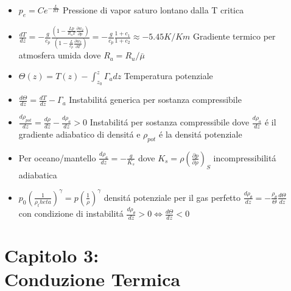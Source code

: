 \documentclass[a4paper]{article}
\begin{document}
\begin{itemize}
	\item $ p_e = C e^{- \frac{L}{RT}}$ Pressione di vapor saturo lontano dalla T critica
	\item $\frac{dT}{dz} = -\frac{g}{c_p} \frac{(1-\frac{Lp}{R_a T} \frac{\partial w_2}{\partial p})}{(1- \frac{L}{c_p} \frac{\partial w_2}{\partial T})} = -\frac{g}{c_p} \frac{1+c_1}{1+c_2} \approx -5.45K/Km$ Gradiente termico per atmosfera umida dove $R_a = R_u / \bar{\mu}$
	\item $\Theta (z)=T(z)-\int_{z_0}^{z}\Gamma_adz$ Temperatura potenziale
	\item $\frac{d \Theta}{dz}=\frac{dT}{dz}-\Gamma_a$ Instabilit\'a generica per sostanza compressibile
	\item $\frac{d \rho_{pot}}{dz}=\frac{d \rho}{dz}-\frac{d \rho_a}{dz}>0 $ Instabilit\'a per sostanza compressibile dove $\frac{d \rho_a}{dz}$ \'e il gradiente adiabatico di densit\'a e $\rho_{pot}$ \'e la densit\'a potenziale
	\item Per oceano/mantello $\frac{d \rho_a}{dz} = - \frac{g}{K_s}$ dove $K_s=\rho (\frac{\partial p}{\partial \rho})_S$ incompressibilit\'a adiabatica
	\item $p_0(\frac{1}{\rho_theta})^\gamma=p(\frac{1}{\rho})^\gamma$ densit\'a potenziale per il gas perfetto $\frac{d \rho_\theta}{dz}=-\frac{\rho_\theta}{\Theta} \frac{d \Theta}{dz}$ \\con condizione di instabilit\'a $\frac{d \rho_\theta}{dz}>0 \iff \frac{d\Theta}{dz}<0$
	
\end{itemize}

\section{Capitolo 3:\\ Conduzione Termica}
\end{document}

